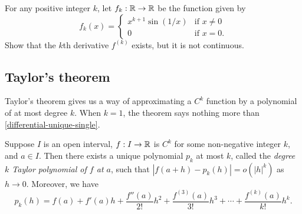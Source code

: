 \begin{exercise}
	For any positive integer $k$, let $f_k : \mathbb{R} \to \mathbb{R}$ be the function given by
	\[ f_k(x) = \begin{cases} x^{k+1} \sin(1/x) &  \text{if } x \neq 0 \\ 0 & \text{if } x = 0. \end{cases} \]
	Show that the $k$th derivative $f^{(k)}$ exists, but it is not continuous. 
\end{exercise}

\subsection{Taylor's theorem \starred}

Taylor's theorem gives us a way of approximating a $C^k$ function by a polynomial of at most degree $k$. When $k = 1$, the theorem says nothing more than \cref{differential-unique-single}.

\begin{theorem}[Taylor] \label{taylor-single}
	Suppose $I$ is an open interval, $f : I \to \mathbb{R}$ is $C^k$ for some non-negative integer $k$, and $a \in I$. Then there exists a unique polynomial $p_k$ at most $k$, called the \emph{degree $k$ Taylor polynomial of $f$ at $a$}, such that $|f(a+h) - p_k(h)| = o(|h|^k)$ as $h \to 0$. Moreover, we have
	\begin{equation} \label{taylor-polynomial-single} p_k(h) = f(a) + f'(a)h + \frac{f''(a)}{2!}h^2 + \frac{f^{(3)}(a)}{3!} h^3 + \dotsb + \frac{f^{(k)}(a)}{k!} h^k. \end{equation}
\end{theorem}

